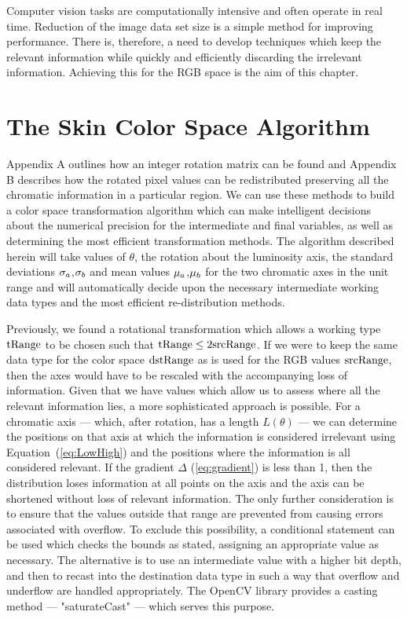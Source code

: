 Computer vision tasks are computationally intensive and often operate in real time. Reduction of the image data set size is a simple method for improving performance. There is, therefore, a need to develop techniques which keep the relevant information while quickly and efficiently discarding the irrelevant information. Achieving this for the RGB space is the aim of this chapter.

\section{The Skin Color Space Algorithm}

Appendix A outlines how an integer rotation matrix can be found and Appendix B describes how the rotated pixel values can be redistributed preserving all the chromatic information in a particular region. We can use these methods to build a color space transformation algorithm which can make intelligent decisions about the numerical precision for the intermediate and final variables, as well as determining the most efficient transformation methods. The algorithm described herein will take values of $\theta$, the rotation about the luminosity axis, the standard deviations $ \sigma_a$,$ \sigma_b$ and mean values $ \mu_a$,$ \mu_b$ for the two chromatic axes in the unit range  and will automatically decide upon the necessary intermediate working data types and the most efficient re-distribution methods.

Previously, we found a rotational transformation which allows a working type $\text{tRange}$ to be chosen such that $\text{tRange} \le 2 \text{srcRange}$. If we were to keep the same data type for the color space $\text{dstRange}$ as is used for the RGB values $\text{srcRange}$, then the axes would have to be rescaled with the accompanying loss of information. Given that we have values which allow us to assess where all the relevant information lies, a more sophisticated approach is possible. For a chromatic axis --- which, after rotation, has a length $L(\theta)$ --- we can determine the positions on that axis at which the information is considered irrelevant using Equation~(\ref{eq:LowHigh}) and the positions where the information is all considered relevant. If the gradient $ \Delta$ (\ref{eq:gradient}) is less than 1, then the distribution loses information at all points on the axis and the axis can be shortened without loss of relevant information. The only further consideration is to ensure that the values outside that range are prevented from causing errors associated with overflow. To exclude this possibility, a conditional statement can be used which checks the bounds as stated, assigning an appropriate value as necessary. The alternative is to use an intermediate value with a higher bit depth, and then to recast into the destination data type in such a way that overflow and underflow are handled appropriately. The OpenCV library provides a casting method --- "saturateCast" --- which serves this purpose.

